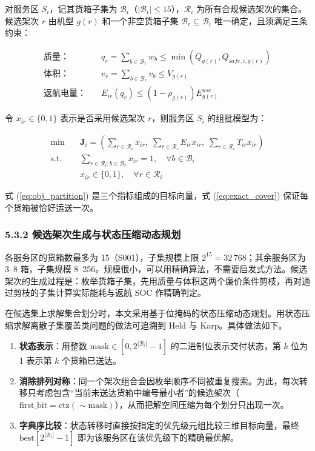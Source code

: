 \documentclass[withoutpreface,bwprint]{format}
\begin{document}
对服务区 $S_i$，记其货箱子集为 $\mathcal{B}_i$（$|\mathcal{B}_i| \le 15$），$\mathcal{R}_i$ 为所有合规候选架次的集合。候选架次 $r$ 由机型 $g(r)$ 和一个非空货箱子集 $\mathcal{B}_r \subseteq \mathcal{B}_i$ 唯一确定，且须满足三条约束：

\begin{align}
\text{质量：} \quad & q_r = \sum_{b \in \mathcal{B}_r} w_b \le \min\left(Q_{g(r)}, Q_{safe, i, g(r)}\right) \\
\text{体积：} \quad & v_r = \sum_{b \in \mathcal{B}_r} v_b \le V_{g(r)} \\
\text{返航电量：} \quad & E_{ir}(q_r) \le (1 - \rho_{g(r)}) E_{g(r)}^{use}
\end{align}

令 $x_{ir} \in \{0,1\}$ 表示是否采用候选架次 $r$，则服务区 $S_i$ 的组批模型为：

\begin{align}
\min \quad & \bm{J}_i = \left( \sum_{r \in \mathcal{R}_i} x_{ir}, \; \sum_{r \in \mathcal{R}_i} E_{ir} x_{ir}, \; \sum_{r \in \mathcal{R}_i} T_{ir} x_{ir} \right) \label{eq:obj_partition} \\
\text{s.t.} \quad & \sum_{r \in \mathcal{R}_i : b \in \mathcal{B}_r} x_{ir} = 1, \quad \forall b \in \mathcal{B}_i \label{eq:exact_cover} \\
& x_{ir} \in \{0, 1\}, \quad \forall r \in \mathcal{R}_i
\end{align}

式 (\ref{eq:obj_partition}) 是三个指标组成的目标向量，式 (\ref{eq:exact_cover}) 保证每个货箱被恰好运送一次。

\subsubsection{5.3.2 候选架次生成与状态压缩动态规划}
各服务区的货箱数最多为 15（S001），子集规模上限 $2^{15}=32\,768$；其余服务区为 3--8 箱，子集规模 8--256。规模很小，可以用精确算法，不需要启发式方法。候选架次的生成过程是：枚举货箱子集，先用质量与体积这两个廉价条件剪枝，再对通过剪枝的子集计算实际能耗与返航 SOC 作精确判定。

在候选集上求解集合划分时，本文采用基于位掩码的状态压缩动态规划。用状态压缩求解离散子集覆盖类问题的做法可追溯到 Held 与 Karp\cite{held1962}。具体做法如下。

\begin{enumerate}[leftmargin=*]
    \item \textbf{状态表示}：用整数 $\text{mask} \in [0, 2^{|\mathcal{B}_i|}-1]$ 的二进制位表示交付状态，第 $k$ 位为 1 表示第 $k$ 个货箱已送达。
    \item \textbf{消除排列对称}：同一个架次组合会因枚举顺序不同被重复搜索。为此，每次转移只考虑包含“当前未送达货箱中编号最小者”的候选架次（$\text{first\_bit} = \text{ctz}(\sim \text{mask})$），从而把解空间压缩为每个划分只出现一次。
    \item \textbf{字典序比较}：状态转移时直接按指定的优先级元组比较三维目标向量，最终 $\text{best}[2^{|\mathcal{B}_i|}-1]$ 即为该服务区在该优先级下的精确最优解。
\end{enumerate}
\end{document}
